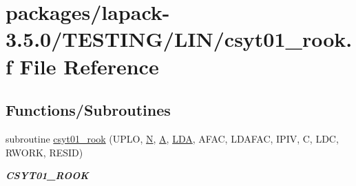 \hypertarget{csyt01__rook_8f}{}\section{packages/lapack-\/3.5.0/\+T\+E\+S\+T\+I\+N\+G/\+L\+I\+N/csyt01\+\_\+rook.f File Reference}
\label{csyt01__rook_8f}
\subsection*{Functions/\+Subroutines}
\begin{DoxyCompactItemize}
\item 
subroutine \hyperlink{group__complex__lin_ga557598c6f5df6f42c9673f8c7121ad2f}{csyt01\+\_\+rook} (U\+P\+L\+O, \hyperlink{polmisc_8c_a0240ac851181b84ac374872dc5434ee4}{N}, \hyperlink{classA}{A}, \hyperlink{example__user_8c_ae946da542ce0db94dced19b2ecefd1aa}{L\+D\+A}, A\+F\+A\+C, L\+D\+A\+F\+A\+C, I\+P\+I\+V, C, L\+D\+C, R\+W\+O\+R\+K, R\+E\+S\+I\+D)
\begin{DoxyCompactList}\small\item\em {\bfseries C\+S\+Y\+T01\+\_\+\+R\+O\+O\+K} \end{DoxyCompactList}\end{DoxyCompactItemize}
